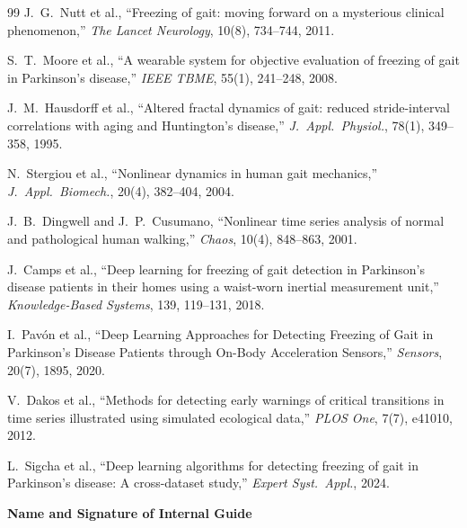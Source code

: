 \documentclass[12pt,a4paper]{article}
\begin{document}
\begin{thebibliography}{99}
J.~G.~Nutt et al., ``Freezing of gait: moving forward on a mysterious clinical phenomenon,''
\textit{The Lancet Neurology}, 10(8), 734--744, 2011.

S.~T.~Moore et al., ``A wearable system for objective evaluation of freezing of gait in
Parkinson's disease,'' \textit{IEEE TBME}, 55(1), 241--248, 2008.

J.~M.~Hausdorff et al., ``Altered fractal dynamics of gait: reduced stride-interval correlations
with aging and Huntington's disease,'' \textit{J.\ Appl.\ Physiol.}, 78(1), 349--358, 1995.

N.~Stergiou et al., ``Nonlinear dynamics in human gait mechanics,'' \textit{J.\ Appl.\
Biomech.}, 20(4), 382--404, 2004.

J.~B.~Dingwell and J.~P.~Cusumano, ``Nonlinear time series analysis of normal and pathological
human walking,'' \textit{Chaos}, 10(4), 848--863, 2001.

J.~Camps et al., ``Deep learning for freezing of gait detection in Parkinson's disease patients
in their homes using a waist-worn inertial measurement unit,'' \textit{Knowledge-Based Systems},
139, 119--131, 2018.

I.~Pav\'{o}n et al., ``Deep Learning Approaches for Detecting Freezing of Gait in Parkinson's
Disease Patients through On-Body Acceleration Sensors,'' \textit{Sensors}, 20(7), 1895, 2020.

V.~Dakos et al., ``Methods for detecting early warnings of critical transitions in time series
illustrated using simulated ecological data,'' \textit{PLOS One}, 7(7), e41010, 2012.

L.~Sigcha et al., ``Deep learning algorithms for detecting freezing of gait in Parkinson's
disease: A cross-dataset study,'' \textit{Expert Syst.\ Appl.}, 2024.

\end{thebibliography}

\newpage

\vspace*{0.85\textheight}

\hfill
\textbf{Name and Signature of Internal Guide}
\end{document}

